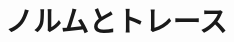 \documentclass[../master_galois_theory]{subfiles}
\begin{document}
\setcounter{section}{9}

\section{ノルムとトレース}
\end{document}
